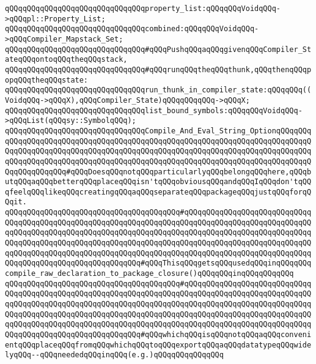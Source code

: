 \newline
\verb|qQQqqQQqqQQqqQQqqQQqqQQqqQQqqQQqproperty_list:qQQqqQQqVoidqQQq->qQQqpl::Property_List;|\newline
\newline
\newline
\verb|qQQqqQQqqQQqqQQqqQQqqQQqqQQqqQQqcombined:qQQqqQQqVoidqQQq->qQQqCompiler_Mapstack_Set;|\newline
\newline
\verb|qQQqqQQqqQQqqQQqqQQqqQQqqQQqqQQq#qQQqPushqQQqaqQQqgivenqQQqCompiler_StateqQQqontoqQQqtheqQQqstack,|\newline
\verb|qQQqqQQqqQQqqQQqqQQqqQQqqQQqqQQq#qQQqrunqQQqtheqQQqthunk,qQQqthenqQQqpopqQQqtheqQQqstate:|\newline
\newline
\verb|qQQqqQQqqQQqqQQqqQQqqQQqqQQqqQQqrun_thunk_in_compiler_state:qQQqqQQq((VoidqQQq->qQQqX),qQQqCompiler_State)qQQqqQQqqQQq->qQQqX;|\newline
\newline
\verb|qQQqqQQqqQQqqQQqqQQqqQQqqQQqqQQqlist_bound_symbols:qQQqqQQqVoidqQQq->qQQqList(qQQqsy::SymbolqQQq);|\newline
\newline
\verb|qQQqqQQqqQQqqQQqqQQqqQQqqQQqqQQqCompile_And_Eval_String_OptionqQQqqQQqqQQqqQQqqQQqqQQqqQQqqQQqqQQqqQQqqQQqqQQqqQQqqQQqqQQqqQQqqQQqqQQqqQQqqQQqqQQqqQQqqQQqqQQqqQQqqQQqqQQqqQQqqQQqqQQqqQQqqQQqqQQqqQQqqQQqqQQqqQQqqQQqqQQqqQQqqQQqqQQqqQQqqQQqqQQqqQQqqQQqqQQqqQQqqQQqqQQqqQQqqQQqqQQqqQQqqQQqqQQqqQQq#qQQqDoesqQQqnotqQQqparticularlyqQQqbelongqQQqhere,qQQqbutqQQqaqQQqbetterqQQqplaceqQQqisn'tqQQqobviousqQQqandqQQqIqQQqdon'tqQQqfeelqQQqlikeqQQqcreatingqQQqaqQQqseparateqQQqpackageqQQqjustqQQqforqQQqit.|\newline
\verb|qQQqqQQqqQQqqQQqqQQqqQQqqQQqqQQqqQQqqQQq#qQQqqQQqqQQqqQQqqQQqqQQqqQQqqQQqqQQqqQQqqQQqqQQqqQQqqQQqqQQqqQQqqQQqqQQqqQQqqQQqqQQqqQQqqQQqqQQqqQQqqQQqqQQqqQQqqQQqqQQqqQQqqQQqqQQqqQQqqQQqqQQqqQQqqQQqqQQqqQQqqQQqqQQqqQQqqQQqqQQqqQQqqQQqqQQqqQQqqQQqqQQqqQQqqQQqqQQqqQQqqQQqqQQqqQQqqQQqqQQqqQQqqQQqqQQqqQQqqQQqqQQqqQQqqQQqqQQqqQQqqQQqqQQqqQQqqQQqqQQqqQQqqQQqqQQqqQQqqQQqqQQqqQQqqQQqqQQqqQQq#qQQqThisqQQqgetsqQQqusedqQQqinqQQqqQQqcompile_raw_declaration_to_package_closure()qQQqqQQqinqQQqqQQqqQQq|\newline
\verb|qQQqqQQqqQQqqQQqqQQqqQQqqQQqqQQqqQQqqQQq#qQQqqQQqqQQqqQQqqQQqqQQqqQQqqQQqqQQqqQQqqQQqqQQqqQQqqQQqqQQqqQQqqQQqqQQqqQQqqQQqqQQqqQQqqQQqqQQqqQQqqQQqqQQqqQQqqQQqqQQqqQQqqQQqqQQqqQQqqQQqqQQqqQQqqQQqqQQqqQQqqQQqqQQqqQQqqQQqqQQqqQQqqQQqqQQqqQQqqQQqqQQqqQQqqQQqqQQqqQQqqQQqqQQqqQQqqQQqqQQqqQQqqQQqqQQqqQQqqQQqqQQqqQQqqQQqqQQqqQQqqQQqqQQqqQQqqQQqqQQqqQQqqQQqqQQqqQQqqQQqqQQqqQQqqQQqqQQqqQQq#qQQqwhichqQQqisqQQqnotqQQqaqQQqconvenientqQQqplaceqQQqfromqQQqwhichqQQqtoqQQqexportqQQqaqQQqdatatypeqQQqwidelyqQQq--qQQqneededqQQqinqQQq(e.g.)qQQqqQQqqQQqqQQq|\newline
